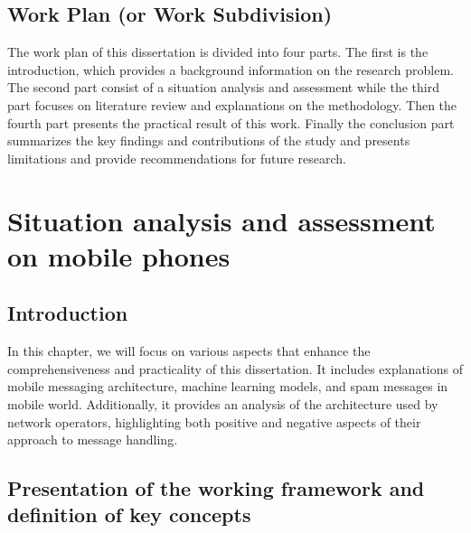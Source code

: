 \documentclass[12pt,a4paper]{report}
\begin{document}
	\section{Work Plan (or Work Subdivision)}
	The work plan of this dissertation is divided into four parts. The first is the introduction, which provides a background information on the research problem.
	The second part consist of a situation analysis and assessment while the third part focuses on literature review and explanations on the methodology. Then the fourth part presents the practical result of this work. Finally the conclusion part summarizes the key findings and contributions of the study and presents limitations and provide recommendations for future research. 
		
	\chapter{Situation analysis and assessment on mobile phones}
	\section{Introduction}
	In this chapter, we will focus on various aspects that enhance the comprehensiveness and practicality of this dissertation. It includes explanations of mobile messaging architecture, machine learning models, and spam messages in mobile world. Additionally, it provides an analysis of the architecture used by network operators, highlighting both positive and negative aspects of their approach to message handling.
	\section{Presentation of the working framework and definition of key concepts}
\end{document}
